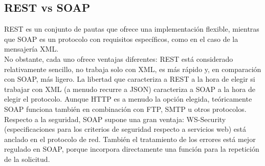 \documentclass[
	12pt, %
	fleqn, %
	a4paper, %
	oneside, %
]{LegrandOrangeBook}
\begin{document}
\subsection{REST vs SOAP}
REST es un conjunto de pautas que ofrece una implementación flexible, mientras que SOAP es un protocolo con requisitos específicos, como en el caso de la mensajería XML.\\
No obstante, cada uno ofrece ventajas diferentes: REST está considerado relativamente sencillo, no trabaja solo con XML, es más rápido y, en comparación con SOAP, más ligero. La libertad que caracteriza a REST a la hora de elegir si trabajar con XML (a menudo recurre a JSON) caracteriza a SOAP a la hora de elegir el protocolo. Aunque HTTP es a menudo la opción elegida, teóricamente SOAP funciona también en combinación con FTP, SMTP u otros protocolos.\\
Respecto a la seguridad, SOAP supone una gran ventaja: WS-Security (especificaciones para los criterios de seguridad respecto a servicios web) está anclado en el protocolo de red. También el tratamiento de los errores está mejor regulado en SOAP, porque incorpora directamente una función para la repetición de la solicitud.
\end{document}
